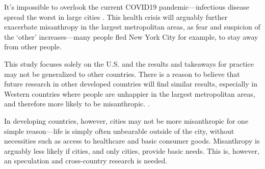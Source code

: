 \documentclass[11pt, letterpaper]{article}
\begin{document}
\begin{spacing}{1.4}
It's impossible to overlook the current COVID19 pandemic---infectious disease
spread the worst in large cities \citep{bettencourt10}. This health crisis will arguably further exacerbate misanthropy in the largest metropolitan areas, as fear and suspicion of the `other' increases---many people fled New York City for example, to stay  away from other people. 



This study focuses solely on the U.S. and the results and takeaways for practice may
not be generalized to other countries. 
There is a reason to believe that future research in other developed countries will find similar results, especially in Western countries where people are unhappier in the largest metropolitan areas, and therefore more likely to be misanthropic. \citep{aokCityBook15}.

In developing countries, however, cities may not be more misanthropic for one simple
reason---life is simply often unbearable outside of the city, without necessities such as access to healthcare and basic consumer goods. Misanthropy is arguably less likely if cities, and only cities, provide basic needs. This is, however, an speculation and cross-country research is needed.






  


\end{spacing}
\end{document}

